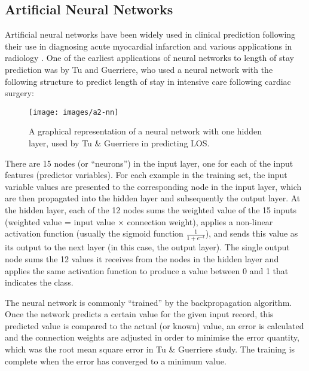 \subsection{Artificial Neural Networks}
Artificial neural networks have been widely used in clinical prediction
following their use in diagnosing acute myocardial infarction and various
applications in radiology \citep{Baxt1995}.
One of the earliest applications of neural networks to
length of stay prediction was by Tu and Guerriere, who used a neural network
with the following structure \citep{Tu1993} to predict length of stay in
intensive care following cardiac surgery:
\begin{figure}[h]
\centering
\texttt{[image: images/a2-nn]}
\caption{A graphical representation of a neural network with one hidden layer,
used by Tu \& Guerriere in predicting LOS.}
\end{figure}

There are 15 nodes (or ``neurons'') in the input layer, one for each of the
input features (predictor variables). For each example in the training set,
the input variable values are presented to the corresponding node in the input
layer, which are then propagated into the hidden layer and subsequently the
output layer. At the hidden layer, each of the 12 nodes sums the weighted
value of the 15 inputs (weighted value = input value $\times$ connection
weight), applies a non-linear activation function (usually the sigmoid function
$\frac{1}{1+e^{-t}}$), and sends this value as its output to the next layer
(in this case, the output layer). The single output node sums the 12 values
it receives from the nodes in the hidden layer and applies the same activation
function to produce a value between 0 and 1 that indicates the class.

The neural network is commonly ``trained'' by the backpropagation algorithm.
Once the network predicts a certain value for the given input record, this
predicted value is compared to the actual (or known) value, an error is
calculated and the connection weights are adjusted in order to minimise the
error quantity, which was the root mean square error in Tu \& Guerriere study.
The training is complete when the error has converged to a minimum value.

